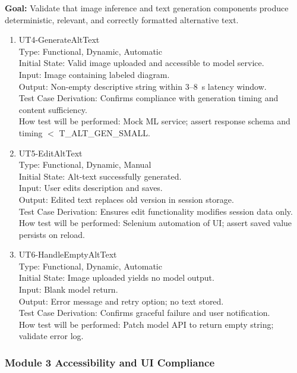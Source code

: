 \documentclass[12pt, titlepage]{article}
\begin{document}
\textbf{Goal:} Validate that image inference and text generation
components produce deterministic, relevant, and correctly formatted
alternative text.

\begin{enumerate}
\item{UT4-GenerateAltText\\}
  Type: Functional, Dynamic, Automatic\\
  Initial State: Valid image uploaded and accessible to model service.\\
  Input: Image containing labeled diagram.\\
  Output: Non-empty descriptive string within 3--8~s latency window.\\
  Test Case Derivation: Confirms compliance with generation timing
  and content sufficiency.\\
  How test will be performed: Mock ML service; assert response schema
  and timing $<$ T\_ALT\_GEN\_SMALL.

\item{UT5-EditAltText\\}
  Type: Functional, Dynamic, Manual\\
  Initial State: Alt-text successfully generated.\\
  Input: User edits description and saves.\\
  Output: Edited text replaces old version in session storage.\\
  Test Case Derivation: Ensures edit functionality modifies session data only.\\
  How test will be performed: Selenium automation of UI; assert saved
  value persists on reload.

\item{UT6-HandleEmptyAltText\\}
  Type: Functional, Dynamic, Automatic\\
  Initial State: Image uploaded yields no model output.\\
  Input: Blank model return.\\
  Output: Error message and retry option; no text stored.\\
  Test Case Derivation: Confirms graceful failure and user notification.\\
  How test will be performed: Patch model API to return empty string;
  validate error log.
\end{enumerate}

\subsubsection{Module 3 \textemdash{} Accessibility and UI Compliance}
\end{document}
